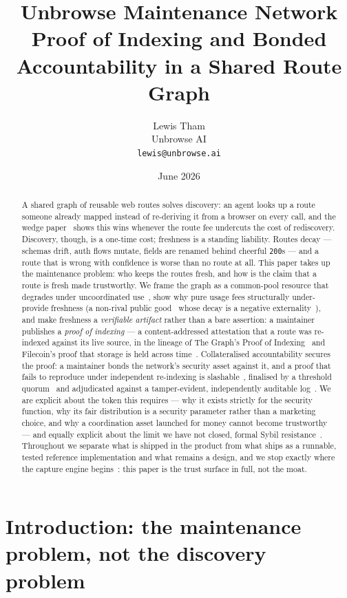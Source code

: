 \documentclass[11pt]{article}
\title{\textbf{Unbrowse Maintenance Network}\\
\large Proof of Indexing and Bonded Accountability in a Shared Route Graph}
\author{Lewis Tham\\ Unbrowse AI \\ \texttt{lewis@unbrowse.ai}}
\date{June 2026}
\begin{document}
\maketitle

\begin{abstract}
A shared graph of reusable web routes solves discovery: an agent looks up a route
someone already mapped instead of re-deriving it from a browser on every call, and
the wedge paper~\cite{wedge} shows this wins whenever the route fee
undercuts the cost of rediscovery. Discovery, though, is a one-time cost; freshness
is a standing liability. Routes decay --- schemas drift, auth flows mutate, fields
are renamed behind cheerful \texttt{200}s --- and a route that is wrong with
confidence is worse than no route at all. This paper takes up the maintenance
problem: who keeps the routes fresh, and how is the claim that a route is fresh made
trustworthy. We frame the graph as a common-pool resource that degrades under
uncoordinated use~\cite{ostrom}, show why pure usage fees structurally under-provide
freshness (a non-rival public good~\cite{samuelson} whose decay is a negative
externality~\cite{pigou}), and make freshness a \emph{verifiable artifact} rather
than a bare assertion: a maintainer publishes a \emph{proof of indexing} --- a
content-addressed attestation that a route was re-indexed against its live source,
in the lineage of The Graph's Proof of Indexing~\cite{thegraph} and Filecoin's proof
that storage is held across time~\cite{filecoin2017}. Collateralised accountability
secures the proof: a maintainer bonds the network's security asset against it, and a
proof that fails to reproduce under independent re-indexing is slashable~\cite{casper},
finalised by a threshold quorum~\cite{frost} and adjudicated against a
tamper-evident, independently auditable log~\cite{rfc6962}. We are explicit about the token this
requires --- why it exists strictly for the security function, why its fair
distribution is a
security parameter rather than a marketing choice, and why a coordination asset
launched for money cannot become trustworthy --- and equally explicit about the
limit we have not closed, formal Sybil resistance~\cite{sybil}. Throughout we
separate what is shipped in the product from what ships as a runnable, tested
reference implementation and what remains a design, and we stop exactly where the
capture engine begins~\cite{ossnotice}: this paper is the trust surface in full,
not the moat.
\end{abstract}

\section{Introduction: the maintenance problem, not the discovery problem}
\end{document}
